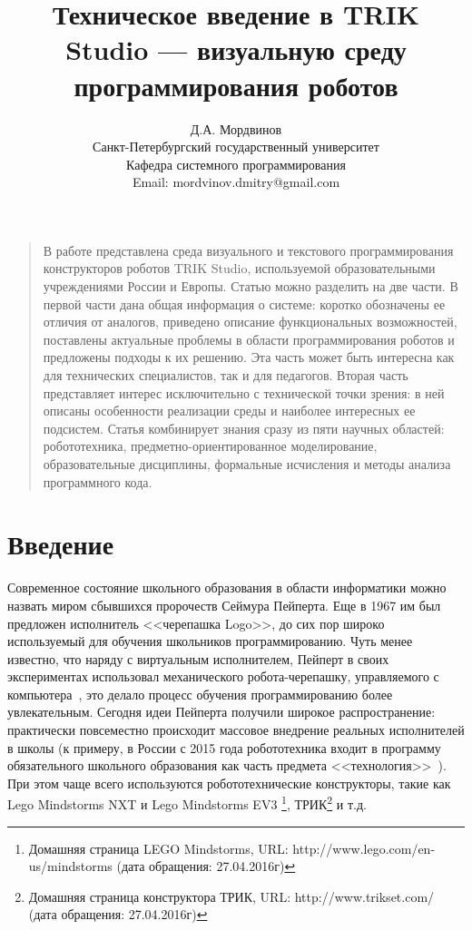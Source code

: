 \documentclass[a5paper]{article}
\title{Техническое введение в TRIK Studio --- визуальную среду программирования роботов}
\author{
	Д.А. Мордвинов \\
	Санкт-Петербургский государственный университет\\
	Кафедра системного программирования\\
	Email: mordvinov.dmitry@gmail.com
}
\date{}
\begin{document}
\maketitle
\thispagestyle{empty}

\begin{quote}
\small\noindent В работе представлена среда визуального и текстового программирования конструкторов роботов TRIK Studio, используемой образовательными учреждениями России и Европы. Статью можно разделить на две части. В первой части дана общая информация о системе: коротко обозначены ее отличия от аналогов, приведено описание функциональных возможностей, поставлены актуальные проблемы в области программирования роботов и предложены подходы к их решению. Эта часть может быть интересна как для технических специалистов, так и для педагогов. Вторая часть представляет интерес исключительно с технической точки зрения: в ней описаны особенности реализации среды и наиболее интересных ее подсистем. Статья комбинирует знания сразу из пяти научных областей: робототехника, предметно-ориентированное моделирование, образовательные дисциплины, формальные исчисления и методы анализа программного кода.
\end{quote}

\section*{Введение}
\label{chapter:introduction}

Современное состояние школьного образования в области информатики можно назвать миром сбывшихся пророчеств Сеймура Пейперта. Еще в 1967 им был предложен исполнитель <<черепашка Logo>>, до сих пор широко используемый для обучения школьников программированию. Чуть менее известно, что наряду с виртуальным исполнителем, Пейперт в своих экспериментах использовал механического робота-черепашку, управляемого с компьютера~\cite{papert1980mindstorms}, это делало процесс обучения программированию более увлекательным. Сегодня идеи Пейперта получили широкое распространение: практически повсеместно происходит массовое внедрение реальных исполнителей в школы (к примеру, в России с 2015 года робототехника входит в программу обязательного школьного образования как часть предмета <<технология>>~\cite{черёмухин2014внедрение,лучин2016внедрение}). При этом чаще всего используются робототехнические конструкторы, такие как Lego Mindstorms NXT и Lego Mindstorms EV3%
\footnote{Домашняя страница LEGO Mindstorms, URL: http://www.lego.com/en-us/mindstorms (дата обращения: 27.04.2016г)}, 
ТРИК\footnote{Домашняя страница конструктора ТРИК, URL: http://www.trikset.com/ (дата обращения: 27.04.2016г)} и т.д. 
\end{document}
